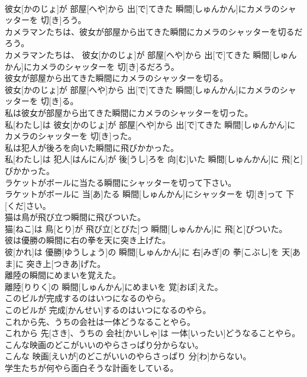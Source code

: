 \documentclass[8pt]{extreport}
\begin{document}
\begin{CJK}{UTF8}{min}
\\	彼女[かのじょ]が 部屋[へや]から 出[で]てきた 瞬間[しゅんかん]にカメラのシャッターを 切[き]ろう。
\\	カメラマンたちは、彼女が部屋から出てきた瞬間にカメラのシャッターを切るだろう。	
\\	カメラマンたちは、 彼女[かのじょ]が 部屋[へや]から 出[で]てきた 瞬間[しゅんかん]にカメラのシャッターを 切[き]るだろう。
\\	彼女が部屋から出てきた瞬間にカメラのシャッターを切る。	
\\	彼女[かのじょ]が 部屋[へや]から 出[で]てきた 瞬間[しゅんかん]にカメラのシャッターを 切[き]る。
\\	私は彼女が部屋から出てきた瞬間にカメラのシャッターを切った。	
\\	私[わたし]は 彼女[かのじょ]が 部屋[へや]から 出[で]てきた 瞬間[しゅんかん]にカメラのシャッターを 切[き]った。
\\	私は犯人が後ろを向いた瞬間に飛びかかった。	
\\	私[わたし]は 犯人[はんにん]が 後[うし]ろを 向[む]いた 瞬間[しゅんかん]に 飛[と]びかかった。
\\	ラケットがボールに当たる瞬間にシャッターを切って下さい。	
\\	ラケットがボールに 当[あ]たる 瞬間[しゅんかん]にシャッターを 切[き]って 下[くだ]さい。
\\	猫は鳥が飛び立つ瞬間に飛びついた。	
\\	猫[ねこ]は 鳥[とり]が 飛び立[とびた]つ 瞬間[しゅんかん]に 飛[と]びついた。
\\	彼は優勝の瞬間に右の拳を天に突き上げた。	
\\	彼[かれ]は 優勝[ゆうしょう]の 瞬間[しゅんかん]に 右[みぎ]の 拳[こぶし]を 天[あま]に 突き上[つきあ]げた。
\\	離陸の瞬間にめまいを覚えた。	
\\	離陸[りりく]の 瞬間[しゅんかん]にめまいを 覚[おぼ]えた。
\\	このビルが完成するのはいつになるのやら。	
\\	このビルが 完成[かんせい]するのはいつになるのやら。
\\	これから先、うちの会社は一体どうなることやら。	
\\	これから 先[さき]、うちの 会社[かいしゃ]は 一体[いったい]どうなることやら。
\\	こんな映画のどこがいいのやらさっぱり分からない。	
\\	こんな 映画[えいが]のどこがいいのやらさっぱり 分[わ]からない。
\\	学生たちが何やら面白そうな計画をしている。	

\end{CJK}
\end{document}
